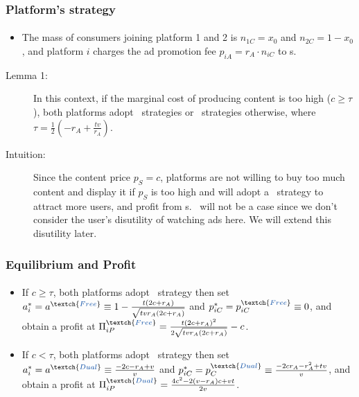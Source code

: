 \documentclass{beamer}
\newcommand{\hl}[1]{\textcolor{myblue}{#1}}
\newcommand{\adv}{\text{advertiser}}
\newcommand{\fc}{\textch{\hl{Free-content}}}
\newcommand{\nad}{\textch{\hl{No-ad}}}
\newcommand{\dual}{\textch{\hl{Dual}}}
\newcommand{\free}{\textch{\hl{Free}}}
\begin{document}
\begin{frame}%
    \frametitle{Platform's strategy}
    \framesubtitle{}
    \begin{itemize}
        \item The mass of consumers joining platform 1 and 2 is
            $n_{1C}=x_0$ and $n_{2C}=1-x_0$, and platform $i$
            charges the ad promotion fee $p_{iA}=r_A\cdot n_{iC}$
            to \adv s.
    \end{itemize}
    \begin{description}
        \item[Lemma 1:] In this context, if the marginal cost of 
            producing content is too high ($c\geq\tau$), both platforms adopt
            \fc\ strategies or \dual\ strategies otherwise, where
            $\tau=\frac{1}{2}\left(-r_A+\frac{tv}{r_A}\right)$.
        \item[Intuition:] Since the content price $p_S=c$, platforms are
            not willing to buy too much content and display it 
            if $p_S$ is too high and will adopt a \fc\ strategy to 
            attract more users, and profit from \adv s. \nad\ will not be a case
            since \hl{we don't consider the user's disutility of watching ads here.}
            We will extend this disutility later.
    \end{description}
\end{frame}

\begin{frame}%
    \frametitle{Equilibrium and Profit}
    \framesubtitle{}
    \begin{itemize}
        \item If $c\geq\tau$, both platforms adopt \fc\ strategy
            then set $a_i^*=a^\free\equiv1-\frac{t(2c+r_A)}{\sqrt{tvr_A(2c+r_A)}}$
            and $p_{iC}^*=p_{iC}^\free\equiv0$, and obtain a profit
            at $\Pi_{iP}^\free=\frac{t(2c+r_A)^2}{2\sqrt{tvr_A(2c+r_A)}}-c$.
        \item If $c<\tau$, both platforms adopt \dual\ strategy
            then set $a_i^*=a^\dual\equiv\frac{-2c-r_A+v}{v}$
            and $p_{iC}^*=p_C^\dual\equiv\frac{-2cr_A-r_A^2+tv}{v}$,
            and obtain a profit at $\Pi_{iP}^\dual=\frac{4c^2-2(v-r_A)c+vt}{2v}$.
    \end{itemize}
\end{frame}
\end{document}

